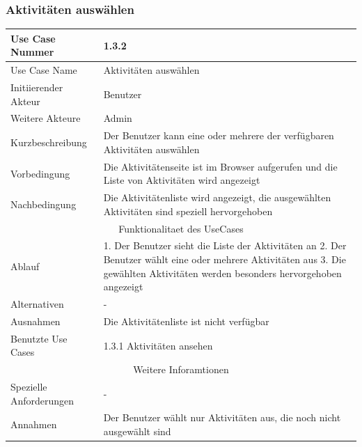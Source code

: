 \documentclass[10pt,a4paper]{article}
\begin{document}
	\subsubsection{Aktivit\"aten ausw\"ahlen}
	\begin{tabular}{|l|p{.5\linewidth}|}
	\hline Use Case Nummer & 1.3.2 \\ 
	\hline Use Case Name & Aktivit\"aten ausw\"ahlen \\ 
	\hline Initiierender Akteur & Benutzer \\
	\hline Weitere Akteure & Admin \\
	\hline Kurzbeschreibung & Der Benutzer kann eine oder mehrere der verf\"ugbaren Aktivit\"aten ausw\"ahlen \\
	\hline Vorbedingung & Die Aktivit\"atenseite ist im Browser aufgerufen und die Liste von Aktivit\"aten wird angezeigt \\
	\hline Nachbedingung & Die Aktivit\"atenliste wird angezeigt, die ausgew\"ahlten Aktivit\"aten sind speziell hervorgehoben \\
	\hline \multicolumn{2}{|c|}{Funktionalitaet des UseCases}\\
	\hline Ablauf & 1. Der Benutzer sieht die Liste der Aktivit\"aten an 2. Der Benutzer w\"ahlt eine oder mehrere Aktivit\"aten aus 3. Die gew\"ahlten Aktivit\"aten werden besonders hervorgehoben angezeigt \\
	\hline Alternativen & - \\
	\hline Ausnahmen & Die Aktivit\"atenliste ist nicht verf\"ugbar \\
	\hline Benutzte Use Cases & 1.3.1 Aktivit\"aten ansehen \\
	\hline \multicolumn{2}{|c|}{Weitere Inforamtionen} \\
	\hline Spezielle Anforderungen & - \\
	\hline Annahmen & Der Benutzer w\"ahlt nur Aktivit\"aten aus, die noch nicht ausgew\"ahlt sind \\
	\hline
	\end{tabular}
	
\end{document}
